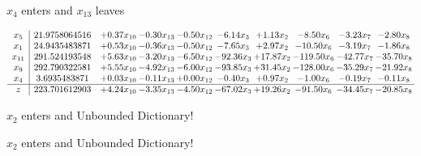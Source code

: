 \documentclass[9pt]{article}
\begin{document}
 $ x_{4} $ enters and $ x_{13} $ leaves 

 \[\begin{array}{c| c c@{\hskip 2pt} c@{\hskip 2pt} c@{\hskip 2pt} c@{\hskip 2pt} c@{\hskip 2pt} c@{\hskip 2pt} c@{\hskip 2pt} c@{\hskip 2pt} }
 x_{5}   &  21.9758064516 & +  0.37 x_{10} & -0.30 x_{13} & -0.50 x_{12} & -6.14 x_{3} & +  1.13 x_{2} & -8.50 x_{6} & -3.23 x_{7} & -2.80 x_{8}\\
 x_{1}   &  24.9435483871 & +  0.53 x_{10} & -0.36 x_{13} & -0.50 x_{12} & -7.65 x_{3} & +  2.97 x_{2} & -10.50 x_{6} & -3.19 x_{7} & -1.86 x_{8}\\
 x_{11}   &  291.524193548 & +  5.63 x_{10} & -3.20 x_{13} & -6.50 x_{12} & -92.36 x_{3} & + 17.87 x_{2} & -119.50 x_{6} & -42.77 x_{7} & -35.70 x_{8}\\
 x_{9}   &  292.790322581 & +  5.55 x_{10} & -4.92 x_{13} & -6.00 x_{12} & -93.85 x_{3} & + 31.45 x_{2} & -128.00 x_{6} & -35.29 x_{7} & -21.92 x_{8}\\
 x_{4}   &  3.6935483871 & +  0.03 x_{10} & -0.11 x_{13} & +  0.00 x_{12} & -0.40 x_{3} & +  0.97 x_{2} & -1.00 x_{6} & -0.19 x_{7} & -0.11 x_{8}\\
\hline
z    &  223.701612903 & +  4.24 x_{10} & -3.35 x_{13} & -4.50 x_{12} & -67.02 x_{3} & + 19.26 x_{2} & -91.50 x_{6} & -34.45 x_{7} & -20.85 x_{8}\\
\end{array}\]


 $ x_{2} $ enters and Unbounded Dictionary!


 $ x_{2} $ enters and Unbounded Dictionary!
\end{document}
